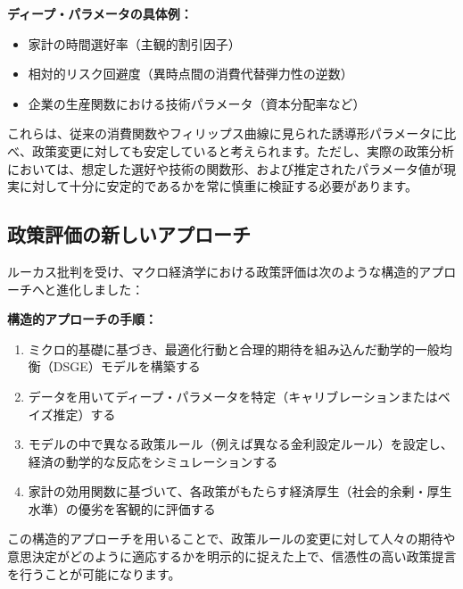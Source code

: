 \documentclass[
  japanese,
  lualatex,
  ja=standard,
  12pt,
  a4paper]{ltjsarticle}
\providecommand{\tightlist}{%
  \setlength{\itemsep}{0pt}\setlength{\parskip}{0pt}}
\begin{document}
\par
\endgroup


\textbf{ディープ・パラメータの具体例：}

\begin{itemize}
\tightlist
\item
  家計の時間選好率（主観的割引因子）
\item
  相対的リスク回避度（異時点間の消費代替弾力性の逆数）
\item
  企業の生産関数における技術パラメータ（資本分配率など）
\end{itemize}

これらは、従来の消費関数やフィリップス曲線に見られた誘導形パラメータに比べ、政策変更に対しても安定していると考えられます。ただし、実際の政策分析においては、想定した選好や技術の関数形、および推定されたパラメータ値が現実に対して十分に安定的であるかを常に慎重に検証する必要があります。

\subsection{政策評価の新しいアプローチ}\label{ux653fux7b56ux8a55ux4fa1ux306eux65b0ux3057ux3044ux30a2ux30d7ux30edux30fcux30c1}

ルーカス批判を受け、マクロ経済学における政策評価は次のような構造的アプローチへと進化しました：


\textbf{構造的アプローチの手順：}

\begin{enumerate}
\def\labelenumi{\arabic{enumi}.}
\tightlist
\item
  ミクロ的基礎に基づき、最適化行動と合理的期待を組み込んだ動学的一般均衡（DSGE）モデルを構築する
\item
  データを用いてディープ・パラメータを特定（キャリブレーションまたはベイズ推定）する
\item
  モデルの中で異なる政策ルール（例えば異なる金利設定ルール）を設定し、経済の動学的な反応をシミュレーションする
\item
  家計の効用関数に基づいて、各政策がもたらす経済厚生（社会的余剰・厚生水準）の優劣を客観的に評価する
\end{enumerate}

この構造的アプローチを用いることで、政策ルールの変更に対して人々の期待や意思決定がどのように適応するかを明示的に捉えた上で、信憑性の高い政策提言を行うことが可能になります。
\end{document}
